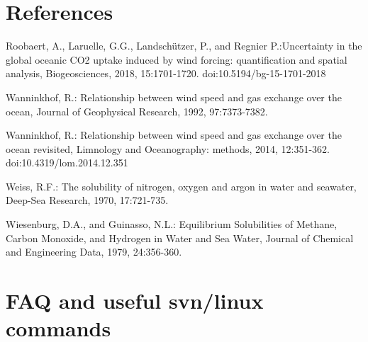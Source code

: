 \documentclass[10pt]{article}
\begin{document}
\section{References}
\begin{thebibliography}{}
	
	Roobaert, A., Laruelle, G.G., Landschützer, P., and Regnier P.:Uncertainty in the global oceanic CO2 uptake induced by wind forcing: quantification and spatial analysis, Biogeosciences, 2018, 15:1701-1720. doi:10.5194/bg-15-1701-2018
	
	Wanninkhof, R.: Relationship between wind speed and gas exchange over the ocean, Journal of Geophysical Research, 1992, 97:7373-7382.
	
	Wanninkhof, R.: Relationship between wind speed and gas exchange over the ocean revisited, Limnology and Oceanography: methods, 2014, 12:351-362. doi:10.4319/lom.2014.12.351
	
	Weiss, R.F.: The solubility of nitrogen, oxygen and argon in water and seawater, Deep-Sea Research, 1970, 17:721-735. 
	
	Wiesenburg, D.A., and Guinasso, N.L.: Equilibrium Solubilities of Methane, Carbon Monoxide, and Hydrogen in Water and Sea Water, Journal of Chemical and Engineering Data, 1979, 24:356-360. 
		
\end{thebibliography}

\section{FAQ and useful svn/linux commands}
\end{document}
